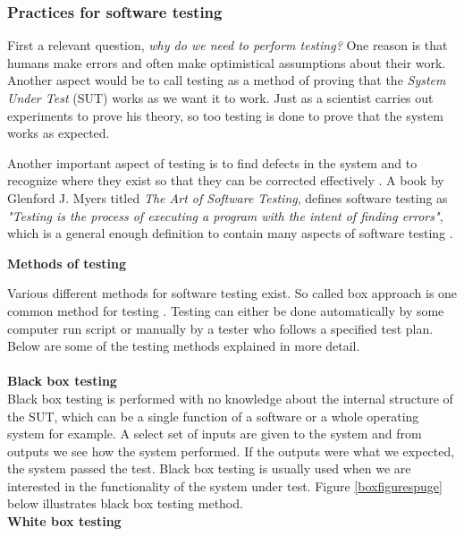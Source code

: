 \documentclass[english,12pt,a4paper,pdftex,elec,utf8]{aaltothesis}
\begin{document}
\subsubsection{Practices for software testing}
First a relevant question, \textit{why do we need to perform testing?} One reason is that humans make errors and often make optimistical assumptions about their work. Another aspect would be to call testing as a method of proving that the \textit{System Under Test} (SUT) works as we want it to work. Just as  a scientist carries out experiments to prove his theory, so too testing is done to prove that the system works as expected. \cite{testingcomplex}\par
Another important aspect of testing is to find defects in the system and to recognize where they exist so that they can be corrected effectively \cite{sularikurssi, artofsofttesting}. A book by Glenford J. Myers titled \textit{The Art of Software Testing}, defines software testing as \textit{"Testing is the process of executing a program with the intent of finding errors"}, which is a general enough definition to contain many aspects of software testing \cite{artofsofttesting}.
\begin{center}
\textbf{Methods of testing}
\end{center}
Various different methods for software testing exist. So called box approach is one common method for testing \cite{sularikurssi, artofsofttesting}. Testing can either be done automatically by some computer run script or manually by a tester who follows a specified test plan. 
Below are some of the testing methods explained in more detail.\\
\\
\textbf{Black box testing}\\ 
Black box testing is performed with no knowledge about the internal structure of the SUT, which can be a single function of a software or a whole operating system for example. A select set of inputs are given to the system and from outputs we see how the system performed. If the outputs were what we expected, the system passed the test. Black box testing is usually used when we are interested in the functionality of the system under test. Figure \ref{boxfigurespuge} below illustrates black box testing method. \cite{artofsofttesting}\\ 
\textbf{White box testing}\\ 
\end{document}
